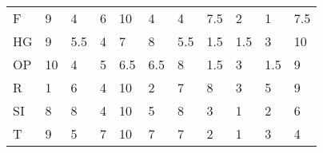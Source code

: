 \documentclass[11pt, a4paper]{article}
\begin{document}
\begin{table}[H]
\begin{tabular}{lllllllllll}
F                             & 9                                        & 4                                & 6                                & 10                                 & 4                                 & 4                               & 7.5                               & 2                                   & 1                                   & 7.5                                 \\
HG                          & 9                                        & 5.5                              & 4                                & 7                                  & 8                                 & 5.5                             & 1.5                               & 1.5                                 & 3                                   & 10                                  \\
OP                       & 10                                       & 4                                & 5                                & 6.5                                & 6.5                               & 8                               & 1.5                               & 3                                   & 1.5                                 & 9                                   \\
R                                & 1                                        & 6                                & 4                                & 10                                 & 2                                 & 7                               & 8                                 & 3                                   & 5                                   & 9                                   \\
SI                        & 8                                        & 8                                & 4                                & 10                                 & 5                                 & 8                               & 3                                 & 1                                   & 2                                   & 6                                   \\
T                              & 9                                        & 5                                & 7                                & 10                                 & 7                                 & 7                               & 2                                 & 1                                   & 3                                   & 4                                   \\

\end{tabular}
\end{table}
\end{document}
